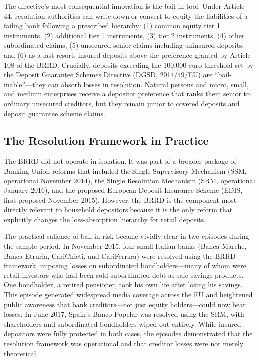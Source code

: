 \documentclass[12pt]{article}
\begin{document}
The directive's most consequential innovation is the bail-in tool. Under Article 44, resolution authorities can write down or convert to equity the liabilities of a failing bank following a prescribed hierarchy: (1) common equity tier 1 instruments, (2) additional tier 1 instruments, (3) tier 2 instruments, (4) other subordinated claims, (5) unsecured senior claims including uninsured deposits, and (6) as a last resort, insured deposits above the preference granted by Article 108 of the BRRD. Crucially, deposits exceeding the 100{,}000 euro threshold set by the Deposit Guarantee Schemes Directive (DGSD, 2014/49/EU) are ``bail-inable''---they can absorb losses in resolution. Natural persons and micro, small, and medium enterprises receive a depositor preference that ranks them senior to ordinary unsecured creditors, but they remain junior to covered deposits and deposit guarantee scheme claims.

\subsection{The Resolution Framework in Practice}

The BRRD did not operate in isolation. It was part of a broader package of Banking Union reforms that included the Single Supervisory Mechanism (SSM, operational November 2014), the Single Resolution Mechanism (SRM, operational January 2016), and the proposed European Deposit Insurance Scheme (EDIS, first proposed November 2015). However, the BRRD is the component most directly relevant to household depositors because it is the only reform that explicitly changes the loss-absorption hierarchy for retail deposits.

The practical salience of bail-in risk became vividly clear in two episodes during the sample period. In November 2015, four small Italian banks (Banca Marche, Banca Etruria, CariChieti, and CariFerrara) were resolved using the BRRD framework, imposing losses on subordinated bondholders---many of whom were retail investors who had been sold subordinated debt as safe savings products. One bondholder, a retired pensioner, took his own life after losing his savings. This episode generated widespread media coverage across the EU and heightened public awareness that bank creditors---not just equity holders---could now bear losses. In June 2017, Spain's Banco Popular was resolved using the SRM, with shareholders and subordinated bondholders wiped out entirely. While insured depositors were fully protected in both cases, the episodes demonstrated that the resolution framework was operational and that creditor losses were not merely theoretical.
\end{document}
